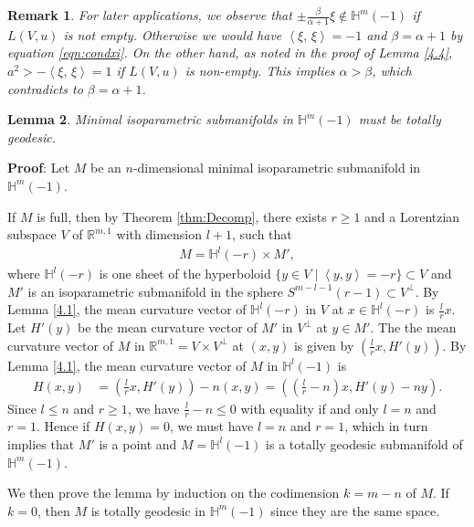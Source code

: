 \documentclass[12pt]{article}
\newtheorem{lem}{Lemma}[section]
\newtheorem{rmk}[lem]{Remark}
\begin{document}
\begin{rmk} \label{neq}
	For later applications, we observe that $\pm \frac{\beta}{\alpha+1} \xi \notin \mathbb{H}^m(-1)$ if $L(V, u)$ is not empty.
Otherwise we would have $\left<\xi, \, \xi \right> = -1$ and $\beta=\alpha+1$ by equation \eqref{eqn:condxi}. On the other hand, as noted in the proof of Lemma \ref{4.4}, $a^2 > - \left<\xi, \, \xi \right> = 1$ if $L(V, u)$ is non-empty.  This implies
$\alpha > \beta$, which contradicts to $\beta=\alpha+1$.
\end{rmk}


	
\begin{lem}\label{4.2.1}
		Minimal isoparametric  submanifolds in $\mathbb{H}^{m}(-1)$ must be totally geodesic.
\end{lem}
\noindent
{\bf Proof}:
Let $M$ be an $n$-dimensional minimal isoparametric submanifold in $\mathbb{H}^{m}(-1)$.	
	
If $M$ is full, then by Theorem \ref{thm:Decomp},
there exists $r \geq 1$ and a Lorentzian subspace $V$ of $\mathbb R^{m,1}$ with dimension $l+1$, such that
\begin{align*}
			M=\mathbb{H}^l(-r) \times M',
\end{align*}
where $\mathbb{H}^l(-r)$ is one sheet of the hyperboloid
$\{y\in V \mid \left<y,y\right>=-r\} \subset V$ and
$M'$ is an isoparametric submanifold in the sphere $S^{m-l-1}(r-1)\subset V^{\perp} $.
By Lemma \ref{4.1}, the mean curvature vector of $\mathbb{H}^l(-r)$ in $V$ at $x \in \mathbb{H}^l(-r)$
is $\frac{l}{r} x$.
Let $H'(y)$ be the mean curvature vector of $M'$ in $V^{\perp}$ at $y \in M'$.
The the mean curvature vector of $M$ in $\mathbb{R}^{m,1} = V \times V^\perp$ at $(x, y)$ is given by
$(\frac{l}{r} x, H'(y))$.
By Lemma \ref{4.1}, the mean curvature vector of $M$ in $\mathbb{H}^l(-1)$ is
		\begin{align*}
			H(x,y)&=(\frac{l}{r} x, H'(y))-n(x,y)
			      =((\frac{l}{r}-n)x, H'(y)-ny).
		\end{align*}
Since $l \leq n$ and $r \geq 1$, we have $\frac{l}{r}-n \leq 0$ with equality if and only $l=n$ and $r=1$.
Hence if $H(x,y)=0$, we must have $l=n$ and $r=1$, which in turn implies that
$M'$ is a point and $M = \mathbb{H}^l(-1)$ is a totally geodesic submanifold of $\mathbb{H}^m(-1)$.

We then prove the lemma by induction on the codimension  $k=m-n$ of $M$.
If $k=0$, then $M$ is totally geodesic in $\mathbb{H}^m(-1)$ since they are the same space.
\end{document}
